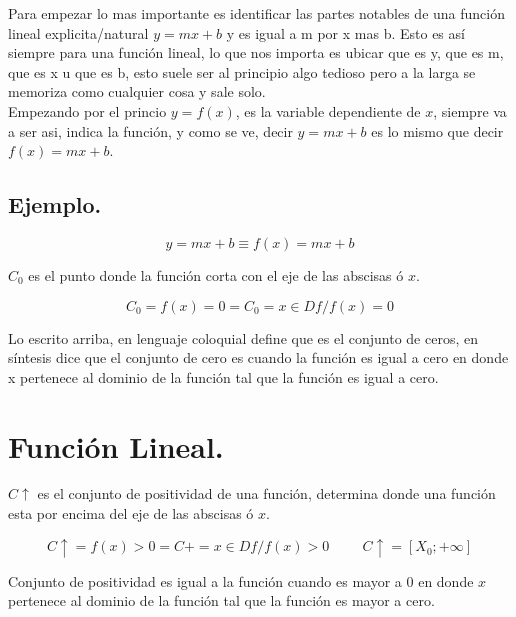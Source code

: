 \documentclass{article}
\begin{document}
	Para empezar lo mas importante es identificar las partes notables de una función lineal explicita/natural $y=mx+b$ y es igual a m por x mas b.
	Esto es así siempre para una función lineal, lo que nos importa es ubicar que es y, que es m, que es x u que es b, esto suele ser al principio algo tedioso pero a la larga se memoriza como cualquier cosa y sale solo. \\
	Empezando por el princio $y = f(x)$, es la variable dependiente de $x$, siempre va a ser asi, indica la función, y como se ve, decir $y = mx+b$ es lo mismo que decir $f(x) = mx+b$.
	\begin{center}
		\section*{Ejemplo.}
		\begin{equation*}
			y = mx+b \equiv f(x)=mx+b
		\end{equation*}
	\end{center}
	
	$C_0$ es el punto donde la función corta con el eje de las abscisas ó $x$.
	\begin{center}
		\begin{equation*}
			C_0 = f(x) = 0 = C_0 = {x\in Df / f(x) = 0}
		\end{equation*}
	\end{center} 
	Lo escrito arriba, en lenguaje coloquial define que es el conjunto de ceros, en síntesis dice que el conjunto de cero es cuando la función es igual a cero en donde x pertenece al dominio de la función tal que la función es igual a cero.
	\pagebreak
	\section*{Función Lineal.}
	\vspace{5pt}
	$C\uparrow$ es el conjunto de positividad de una función, determina donde una función esta por encima del eje de las abscisas ó $x$.
	\begin{center}
		\begin{equation*}
			C\uparrow = f(x) > 0 = C+ = {x\in Df / f(x) > 0} \hspace{1cm} C\uparrow=[X_0;+\infty]
		\end{equation*}
	\end{center}
	Conjunto de positividad es igual a la función cuando es mayor a 0 en donde $x$ pertenece al dominio de la función tal que la función es mayor a cero. \\
	
\end{document}
